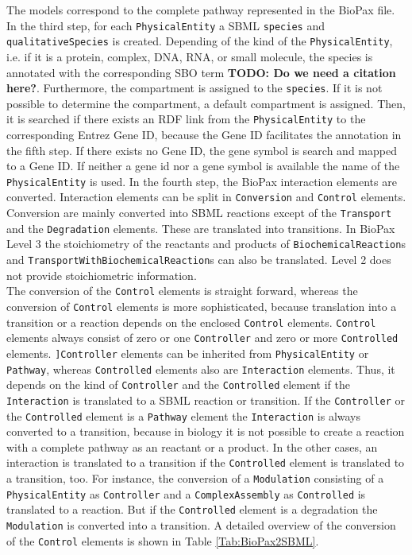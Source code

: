 \documentclass{bioinfo}
\begin{document}
\begin{methods}
The models correspond to the complete pathway represented in the BioPax file.
In the third step, for each \texttt{PhysicalEntity} a SBML \texttt{species} and \texttt{qualitativeSpecies} is created.
Depending of the kind of the \texttt{PhysicalEntity}, i.e. if it is a protein, complex, DNA, RNA, or small molecule, the species is annotated with the corresponding SBO term \textbf{TODO: Do we need a citation here?}.
Furthermore, the compartment is assigned to the \texttt{species}. If it is not possible to determine the compartment, a default compartment is assigned.
Then, it is searched if there exists an RDF link from the \texttt{PhysicalEntity} to the corresponding Entrez Gene ID, because the Gene ID facilitates the annotation in the fifth step.
If there exists no Gene ID, the gene symbol is search and mapped to a Gene ID.
If neither a gene id nor a gene symbol is available the name of the \texttt{PhysicalEntity} is used.
In the fourth step, the BioPax interaction elements are converted. 
Interaction elements can be split in \texttt{Conversion} and \texttt{Control} elements.
Conversion are mainly converted into SBML reactions except of the \texttt{Transport} and the \texttt{Degradation} elements.
These are translated into transitions. 
In BioPax Level 3 the stoichiometry of the reactants and products of \texttt{BiochemicalReaction}s and \texttt{TransportWithBiochemicalReaction}s can also be translated. 
Level 2 does not provide stoichiometric information.\\
The conversion of the \texttt{Control} elements is straight forward, whereas the conversion of \texttt{Control} elements is more sophisticated, because translation into a transition or a reaction depends on the enclosed \texttt{Control} elements.
\texttt{Control} elements always consist of zero or one \texttt{Controller} and zero or more \texttt{Controlled} elements. 
\texttt{]Controller} elements can be inherited from \texttt{PhysicalEntity} or \texttt{Pathway}, whereas \texttt{Controlled} elements also are \texttt{Interaction} elements.
Thus, it depends on the kind of \texttt{Controller} and the \texttt{Controlled} element if the \texttt{Interaction} is translated to a SBML reaction or transition.
If the \texttt{Controller} or the \texttt{Controlled} element is a \texttt{Pathway} element the \texttt{Interaction} is always converted to a transition, because in biology it is not possible to create a reaction with a complete pathway as an reactant or a product.
In the other cases, an interaction is translated to a transition if the \texttt{Controlled} element is translated to a transition, too. 
For instance, the conversion of a \texttt{Modulation} consisting of a \texttt{PhysicalEntity} as \texttt{Controller} and a \texttt{ComplexAssembly} as \texttt{Controlled} is translated to a reaction.
But if the \texttt{Controlled} element is a degradation the \texttt{Modulation} is converted into a transition. 
A detailed overview of the conversion of the \texttt{Control} elements is shown in Table \ref{Tab:BioPax2SBML}.


\end{methods}
\end{document}
